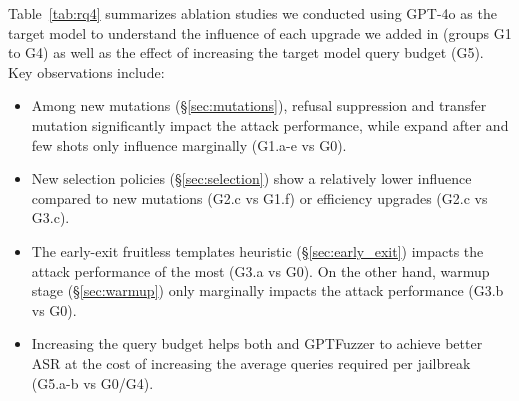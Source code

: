 Table~\ref{tab:rq4} summarizes ablation studies we conducted using GPT-4o as the target model to understand the influence of each upgrade we added in \bedrockfuzz (groups G1 to G4) as well as the effect of increasing the target model query budget (G5). Key observations include:
\begin{itemize}
    \item Among new mutations (\S\ref{sec:mutations}), refusal suppression and transfer mutation significantly impact the attack performance, while expand after and few shots only influence marginally (G1.a-e vs G0).
    \item New selection policies (\S\ref{sec:selection}) show a relatively lower influence compared to new mutations (G2.c vs G1.f) or efficiency upgrades (G2.c vs G3.c).
    \item The early-exit fruitless templates heuristic (\S\ref{sec:early_exit}) impacts the attack performance of \bedrockfuzz the most (G3.a vs G0). On the other hand, warmup stage (\S\ref{sec:warmup}) only marginally impacts the attack performance (G3.b vs G0).
    \item Increasing the query budget helps both \bedrockfuzz and GPTFuzzer to achieve better ASR at the cost of increasing the average queries required per jailbreak (G5.a-b vs G0/G4).
\end{itemize}
